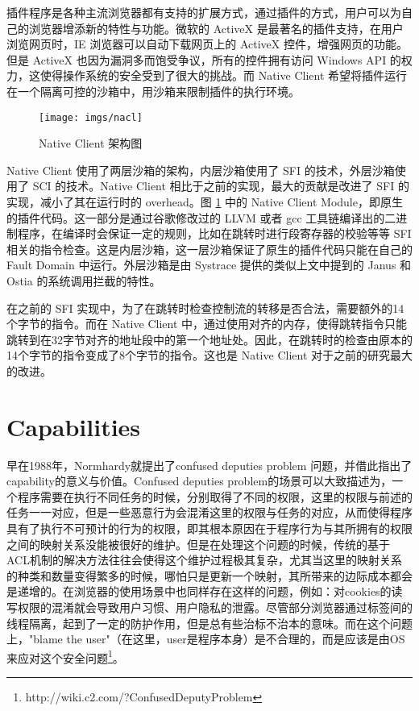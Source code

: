 插件程序是各种主流浏览器都有支持的扩展方式，通过插件的方式，用户可以为自己的浏览器增添新的特性与功能。微软的 ActiveX 是最著名的插件支持，在用户浏览网页时，IE 浏览器可以自动下载网页上的 ActiveX 控件，增强网页的功能。但是 ActiveX 也因为漏洞多而饱受争议，所有的控件拥有访问 Windows API 的权力，这使得操作系统的安全受到了很大的挑战。而 Native Client 希望将插件运行在一个隔离可控的沙箱中，用沙箱来限制插件的执行环境。

\begin{figure}[!htp]
  \centering
  \texttt{[image: imgs/nacl]}
  \caption{Native Client 架构图}
  \label{fig:nacl}
\end{figure}

Native Client 使用了两层沙箱的架构，内层沙箱使用了 SFI 的技术，外层沙箱使用了 SCI 的技术。Native Client 相比于之前的实现，最大的贡献是改进了 SFI 的实现，减小了其在运行时的 overhead。图 \ref{fig:nacl} 中的 Native Client Module，即原生的插件代码。这一部分是通过谷歌修改过的 LLVM 或者 gcc 工具链编译出的二进制程序，在编译时会保证一定的规则，比如在跳转时进行段寄存器的校验等等 SFI 相关的指令检查。这是内层沙箱，这一层沙箱保证了原生的插件代码只能在自己的 Fault Domain 中运行。外层沙箱是由 Systrace \parencite{provos2003improving} 提供的类似上文中提到的 Janus 和 Ostia 的系统调用拦截的特性。

在之前的 SFI 实现中，为了在跳转时检查控制流的转移是否合法，需要额外的14个字节的指令。而在 Native Client 中，通过使用对齐的内存，使得跳转指令只能跳转到在32字节对齐的地址段中的第一个地址处。因此，在跳转时的检查由原本的14个字节的指令变成了8个字节的指令。这也是 Native Client 对于之前的研究最大的改进。

\section{Capabilities}
\label{ss:capabilities}

早在1988年，Normhardy就提出了confused deputies problem \parencite{deputies} 问题，并借此指出了capability的意义与价值。Confused deputies problem的场景可以大致描述为，一个程序需要在执行不同任务的时候，分别取得了不同的权限，这里的权限与前述的任务一一对应，但是一些恶意行为会混淆这里的权限与任务的对应，从而使得程序具有了执行不可预计的行为的权限，即其根本原因在于程序行为与其所拥有的权限之间的映射关系没能被很好的维护。但是在处理这个问题的时候，传统的基于ACL机制的解决方法往往会使得这个维护过程极其复杂，尤其当这里的映射关系的种类和数量变得繁多的时候，哪怕只是更新一个映射，其所带来的边际成本都会是递增的。在浏览器的使用场景中也同样存在这样的问题，例如：对cookies的读写权限的混淆就会导致用户习惯、用户隐私的泄露。尽管部分浏览器通过标签间的线程隔离，起到了一定的防护作用\parencite{capsicum}，但是总有些治标不治本的意味。而在这个问题上，"blame the user"（在这里，user是程序本身）是不合理的，而是应该是由OS来应对这个安全问题\footnote{http://wiki.c2.com/?ConfusedDeputyProblem}。

